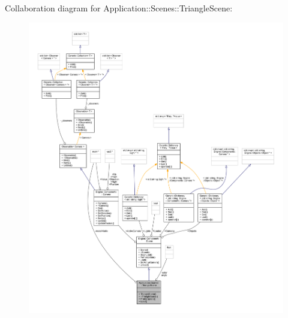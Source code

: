 Collaboration diagram for Application\+:\+:Scenes\+:\+:Triangle\+Scene\+:
\nopagebreak
\begin{figure}[H]
\begin{center}
\leavevmode
\includegraphics[width=350pt]{classApplication_1_1Scenes_1_1TriangleScene__coll__graph}
\end{center}
\end{figure}
